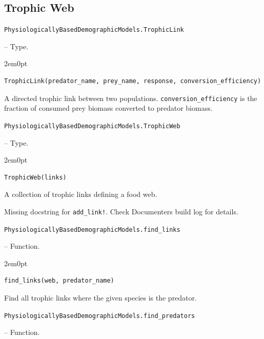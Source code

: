 \subsection{Trophic Web}



\label{17063559281252072000}{}

\hypertarget{15410136445969562006}{\texttt{PhysiologicallyBasedDemographicModels.TrophicLink}}  -- {Type.}

\begin{adjustwidth}{2em}{0pt}


\begin{verbatim}
TrophicLink(predator_name, prey_name, response, conversion_efficiency)
\end{verbatim}

A directed trophic link between two populations. \texttt{conversion\_efficiency} is the fraction of consumed prey biomass converted to predator biomass.



\end{adjustwidth}
\hypertarget{16826066365386335061}{\texttt{PhysiologicallyBasedDemographicModels.TrophicWeb}}  -- {Type.}

\begin{adjustwidth}{2em}{0pt}


\begin{verbatim}
TrophicWeb(links)
\end{verbatim}

A collection of trophic links defining a food web.



\end{adjustwidth}

\begin{tcolorbox}[toptitle=-1mm,bottomtitle=1mm,colback=admonition-warning!50!white,colframe=admonition-warning,title=\textbf{Missing docstring.}]
Missing docstring for \texttt{add\_link!}. Check Documenter{\textquotesingle}s build log for details.

\end{tcolorbox}

\hypertarget{5014101281641069536}{\texttt{PhysiologicallyBasedDemographicModels.find\_links}}  -- {Function.}

\begin{adjustwidth}{2em}{0pt}


\begin{verbatim}
find_links(web, predator_name)
\end{verbatim}

Find all trophic links where the given species is the predator.



\end{adjustwidth}
\hypertarget{467802693033652793}{\texttt{PhysiologicallyBasedDemographicModels.find\_predators}}  -- {Function.}

